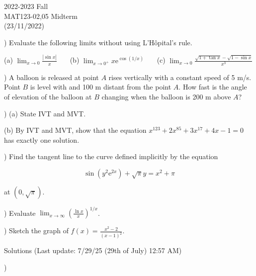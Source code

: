 \documentclass{article}
\begin{document}
\large

\begin{center}
2022-2023 Fall \\MAT123-02,05 Midterm\\(23/11/2022)
\end{center}

) Evaluate the following limits without using L'Hôpital's rule.

\hfill

(a) $\displaystyle \lim_{x\to 0} \frac{\left|\sin x\right|}{x}$ \ \ \ (b) $\displaystyle \lim_{x\to 0^+}x\mathrm{e}^{\displaystyle \cos(1/x)}$ \ \ \ (c) $\displaystyle \lim_{x\to 0}{\frac{\sqrt{1+\tan x} -\sqrt{1-\sin x} }{x^3}}$

\hfill

) A balloon is released at point $A$ rises vertically with a constant speed of 5 m/s. Point $B$ is level with and 100 m distant from the point $A$. How fast is the angle of elevation of the balloon at $B$ changing when the balloon is 200 m above $A$?

\hfill

) (a) State IVT and MVT.

\hfill

\noindent (b) By IVT and MVT, show that the equation $x^{123}+2x^{85} + 3x^{17} + 4x-1 = 0$ has exactly one solution.

\hfill

) Find the tangent line to the curve defined implicitly by the equation

\begin{equation*}
\sin\left(y^2\mathrm{e}^{2x}\right) + \sqrt{\pi}y = x^2 + \pi
\end{equation*}

\noindent at $(0, \sqrt\pi).$

\hfill

) Evaluate $\displaystyle \lim_{x \to \infty} \left(\frac{\ln x}{x}\right)^{1/x}$.

\hfill

) Sketch the graph of $\displaystyle f(x) = \frac{x^2-2}{(x-1)^2}$.

\newpage

\begin{center}
Solutions (Last update: 7/29/25 (29th of July) 12:57 AM)
\end{center}

)

\hfill
\end{document}
